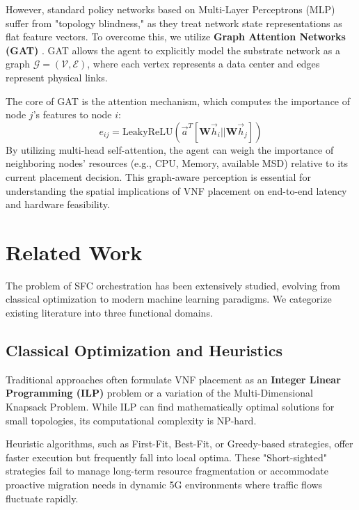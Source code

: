 \documentclass[12pt, a4paper, reqno, oneside]{book}
\begin{document}
However, standard policy networks based on Multi-Layer Perceptrons (MLP) suffer from "topology blindness," as they treat network state representations as flat feature vectors. To overcome this, we utilize \textbf{Graph Attention Networks (GAT)} \cite{velivckovic2017graph}. GAT allows the agent to explicitly model the substrate network as a graph $\mathcal{G} = (\mathcal{V}, \mathcal{E})$, where each vertex represents a data center and edges represent physical links. 

The core of GAT is the attention mechanism, which computes the importance of node $j$'s features to node $i$:
\begin{equation}
e_{ij} = \text{LeakyReLU}\left(\vec{a}^T [\mathbf{W}\vec{h}_i || \mathbf{W}\vec{h}_j]\right)
\end{equation}
By utilizing multi-head self-attention, the agent can weigh the importance of neighboring nodes' resources (e.g., CPU, Memory, available MSD) relative to its current placement decision. This graph-aware perception is essential for understanding the spatial implications of VNF placement on end-to-end latency and hardware feasibility.

\section{Related Work}
\label{sec:related_work}
The problem of SFC orchestration has been extensively studied, evolving from classical optimization to modern machine learning paradigms. We categorize existing literature into three functional domains.

\subsection{Classical Optimization and Heuristics}
Traditional approaches often formulate VNF placement as an \textbf{Integer Linear Programming (ILP)} problem or a variation of the Multi-Dimensional Knapsack Problem. While ILP can find mathematically optimal solutions for small topologies, its computational complexity is NP-hard. 

Heuristic algorithms, such as First-Fit, Best-Fit, or Greedy-based strategies, offer faster execution but frequently fall into local optima. These "Short-sighted" strategies fail to manage long-term resource fragmentation or accommodate proactive migration needs in dynamic 5G environments where traffic flows fluctuate rapidly.
\end{document}
